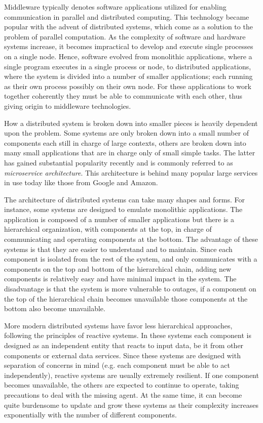 \documentclass[]{spie}  %
\begin{document}
Middleware typically denotes software applications utilized for enabling communication in parallel and distributed computing\cite{BUYYA201329}.
This technology became popular with the advent of distributed systems, which come as a solution to the problem of parallel computation.
As the complexity of software and hardware systems increase, it becomes impractical to develop and execute single processes on a single node.
Hence, software evolved from monolithic applications, where a single program executes in a single process or node, to distributed applications, where the system is divided into a number of smaller applications; each running as their own process possibly on their own node.
For these applications to work together coherently they must be able to communicate with each other, thus giving origin to middleware technologies.

How a distributed system is broken down into smaller pieces is heavily dependent upon the problem.
Some systems are only broken down into a small number of components each still in charge of large contexts, others are broken down into many small applications that are in charge only of small simple tasks.
The latter has gained substantial popularity recently and is commonly referred to as \textit{microservice architecture}.
This  architecture is behind many popular large services in use today like those from Google and Amazon.

The architecture of distributed systems can take many shapes and forms.
For instance, some systems are designed to emulate monolithic applications.
The application is composed of a number of smaller applications but there is a hierarchical organization, with components at the top, in charge of communicating and operating components at the bottom.
The advantage of these systems is that they are easier to understand and to maintain.
Since each component is isolated from the rest of the system, and only communicates with a components on the top and bottom of the hierarchical chain, adding new components is relatively easy and have minimal impact in the system.
The disadvantage is that the system is more vulnerable to outages, if a component on the top of the hierarchical chain becomes unavailable those components at the bottom also become unavailable.

More modern distributed systems have favor less hierarchical approaches, following the principles of reactive systems.
In these systems each component is designed as an independent entity that reacts to input data, be it from other components or external data services.
Since these systems are designed with separation of concerns in mind (e.g. each component must be able to act independently), reactive systems are usually extremely resilient.
If one component becomes unavailable, the others are expected to continue to operate, taking precautions to deal with the missing agent.
At the same time, it can become quite burdensome to update and grow these systems as their complexity increases exponentially with the number of different components.
\end{document}
